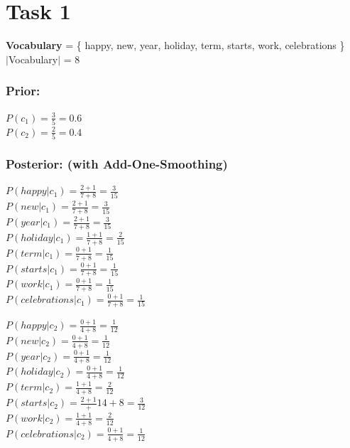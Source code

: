 \documentclass[a4paper]{scrartcl}
\begin{document}
    
\section*{Task 1}
\textbf{Vocabulary} = \{ happy, new, year, holiday, term, starts, work, celebrations \}\\
$|$Vocabulary$|$ = 8

\subsubsection*{Prior:}
    $P(c_1) = \frac{3}{5} = 0.6$\\
    $P(c_2) = \frac{2}{5} = 0.4$ 

\subsubsection*{Posterior: (with Add-One-Smoothing)}
\begin{multicols}{2}
    $P(happy|c_1) = \frac{2 + 1}{7 + 8} = \frac{3}{15}$\\
    $P(new|c_1) = \frac{2 + 1}{7 + 8} = \frac{3}{15}$\\
    $P(year|c_1) = \frac{2 + 1}{7 + 8} = \frac{3}{15}$\\
    $P(holiday|c_1) = \frac{1 + 1}{7 + 8} = \frac{2}{15}$\\
    $P(term|c_1) = \frac{0 + 1}{7 + 8} = \frac{1}{15}$\\
    $P(starts|c_1) = \frac{0 + 1}{7 + 8} = \frac{1}{15}$\\
    $P(work|c_1) = \frac{0 + 1}{7 + 8} = \frac{1}{15}$\\
    $P(celebrations|c_1) = \frac{0 + 1}{7 + 8} = \frac{1}{15}$

    $P(happy|c_2) = \frac{0 + 1}{4 + 8} = \frac{1}{12}$\\
    $P(new|c_2) = \frac{0 + 1}{4 + 8} = \frac{1}{12}$\\
    $P(year|c_2) = \frac{0 + 1}{4 + 8} = \frac{1}{12}$\\
    $P(holiday|c_2) = \frac{0 + 1}{4 + 8} = \frac{1}{12}$\\
    $P(term|c_2) = \frac{1 + 1}{4 + 8} = \frac{2}{12}$\\
    $P(starts|c_2) = \frac{2 + 1} + 1{4 + 8} = \frac{3}{12}$\\
    $P(work|c_2) = \frac{1 + 1}{4 + 8} = \frac{2}{12}$\\
    $P(celebrations|c_2) = \frac{0 + 1}{4 + 8} = \frac{1}{12}$
\end{multicols}
\end{document}

